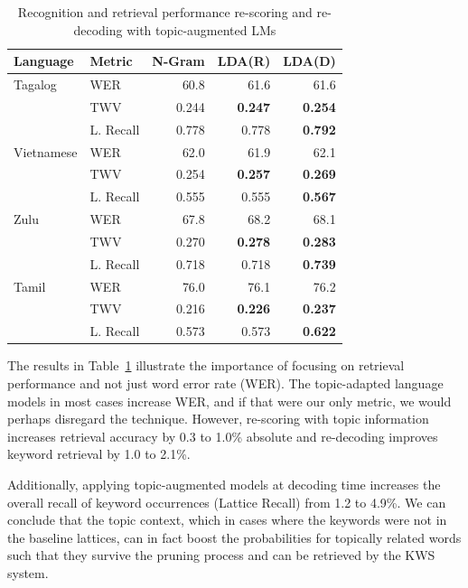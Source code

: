 

\begin{table}
\centering
   \begin{tabular}{l|l|rrr} \toprule
   \bf Language & \bf Metric & \bf N-Gram & \bf LDA(R) & \bf LDA(D) \\ \midrule
Tagalog& WER & 60.8 & 61.6 & 61.6  \\
        & TWV & 0.244 & \textbf{0.247} & \textbf{0.254}\\
        & L. Recall & 0.778 & 0.778 & \textbf{0.792}\\ \midrule
Vietnamese &   WER & 62.0 & 61.9 & 62.1  \\
        & TWV & 0.254 & \textbf{0.257} & \textbf{0.269}\\
        & L. Recall & 0.555 & 0.555 & \textbf{0.567}\\ \midrule
Zulu&   WER & 67.8 & 68.2 & 68.1  \\
        & TWV & 0.270 & \textbf{0.278} & \textbf{0.283}\\
        & L. Recall & 0.718 & 0.718 & \textbf{0.739}\\ \midrule
Tamil&   WER & 76.0 & 76.1 & 76.2  \\
        & TWV & 0.216 & \textbf{0.226} & \textbf{0.237}\\
        & L. Recall & 0.573 & 0.573 & \textbf{0.622}\\ \bottomrule
        \end{tabular}
\caption[Re-scoring and re-decoding with topic-augmented LMs]{Recognition and retrieval performance re-scoring and re-decoding with topic-augmented LMs  \label{fig4:topicLM}}
\end{table}


The results in Table~\ref{fig4:topicLM} illustrate the importance of focusing on retrieval performance and not just word error rate (WER).  The topic-adapted language models in most cases increase WER, and if that were our only metric, we would perhaps disregard the technique.  However, re-scoring with topic information increases retrieval accuracy by 0.3 to 1.0\% absolute and re-decoding improves keyword retrieval by 1.0 to 2.1\%.  

Additionally, applying topic-augmented models at decoding time increases the overall recall of keyword occurrences (Lattice Recall) from 1.2 to 4.9\%.  We can conclude that the topic context, which in cases where the keywords were not in the baseline lattices, can in fact boost the probabilities for topically related words such that they survive the pruning process and can be retrieved by the KWS system.

